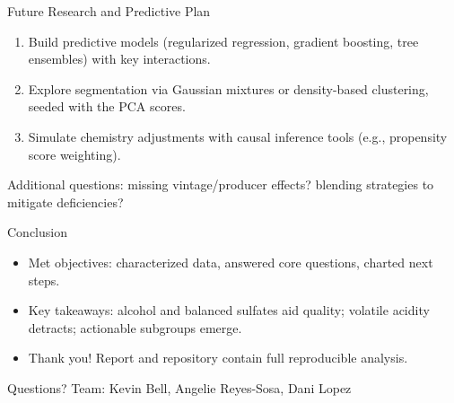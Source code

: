 \documentclass[aspectratio=169]{beamer}
\begin{document}
\begin{frame}{Future Research and Predictive Plan}
  \begin{enumerate}
    \item Build predictive models (regularized regression, gradient boosting, tree ensembles) with key interactions.
    \item Explore segmentation via Gaussian mixtures or density-based clustering, seeded with the PCA scores.
    \item Simulate chemistry adjustments with causal inference tools (e.g., propensity score weighting).
  \end{enumerate}
  \vspace{0.5em}
  \small Additional questions: missing vintage/producer effects? blending strategies to mitigate deficiencies?
\end{frame}

\begin{frame}{Conclusion}
  \begin{itemize}
    \item Met objectives: characterized data, answered core questions, charted next steps.
    \item Key takeaways: alcohol and balanced sulfates aid quality; volatile acidity detracts; actionable subgroups emerge.
    \item Thank you! Report and repository contain full reproducible analysis.
  \end{itemize}
\end{frame}

\begin{frame}[standout]
  Questions?\newline
  \small Team: Kevin Bell, Angelie Reyes-Sosa, Dani Lopez\
\end{frame}
\end{document}
